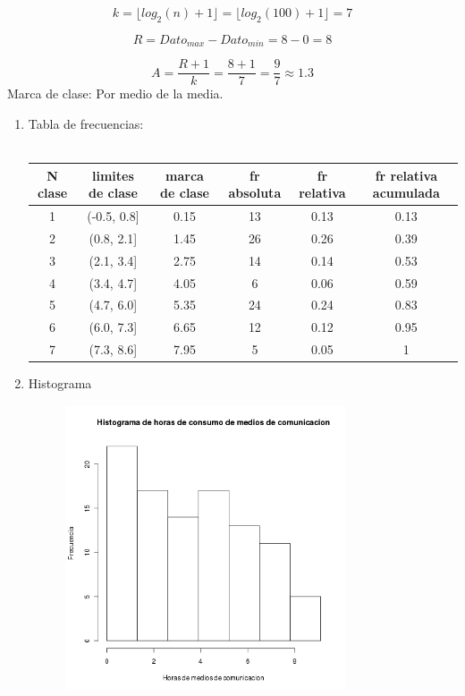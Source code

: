 \documentclass[letterpaper,spanish,11pt]{article}
\begin{document}
\begin{displaymath}
k = \lfloor log_2 (n) + 1\rfloor = \lfloor log_2(100) + 1 \rfloor = 7
\end{displaymath}

\begin{displaymath}
R = Dato_{max} - Dato_{min} = 8 - 0 = 8
\end{displaymath}

\begin{displaymath}
A = \frac{R + 1}{k} = \frac{8 + 1}{7} = \frac{9}{7} \approx 1.3
\end{displaymath}
Marca de clase: Por medio de la media.

\begin{enumerate}
   \item Tabla de frecuencias:\\ \\
     \begin{tabular}{ | c | c | c | c | c | c | }
        \hline
        N clase & limites de clase & marca de clase & fr absoluta & fr relativa & fr relativa acumulada \\
        \hline	
          1 & (-0.5, 0.8] & 0.15 & 13 & 0.13 & 0.13 \\
          2 & (0.8, 2.1] & 1.45 & 26 & 0.26 & 0.39 \\
          3 & (2.1, 3.4] & 2.75 & 14 & 0.14 & 0.53 \\
          4 & (3.4, 4.7] & 4.05 & 6 & 0.06 & 0.59 \\
          5 & (4.7, 6.0] & 5.35 & 24 & 0.24 & 0.83 \\
          6 & (6.0, 7.3] & 6.65 & 12 & 0.12 & 0.95 \\
          7 & (7.3, 8.6] & 7.95 & 5 & 0.05 & 1 \\
        \hline
     \end{tabular}
    \item Histograma
      \begin{figure}[htbp]
      	  \centering
  	  \includegraphics[width=3.3in,height=3.3in]{histograma1}

\end{figure}
\end{enumerate}
\end{document}
